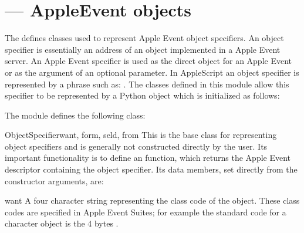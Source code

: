 \section{ ---
         AppleEvent objects}



The  defines classes used to represent Apple Event
object specifiers. An object specifier is essentially an address of an
object implemented in a Apple Event server. An Apple Event specifier
is used as the direct object for an Apple Event or as the argument of
an optional parameter. In AppleScript an object specifier is
represented by a phrase such as:
. The classes defined in
this module allow this specifier to be represented by a Python object
which is initialized as follows:


The  module defines the following class:

\begin{classdesc}{ObjectSpecifier}{want, form, seld, from}
  This is the base class for representing object specifiers and is
  generally not constructed directly by the user. Its important
  functionality is to define an  function,
  which returns the Apple Event descriptor containing the object
  specifier.  Its data members, set directly from the constructor
  arguments, are:
\end{classdesc}

\begin{memberdesc}{want}
  A four character string representing the class code of the
  object. These class codes are specified in Apple Event Suites; for
  example the standard code for a character object is the 4 bytes
  .
\end{memberdesc}
